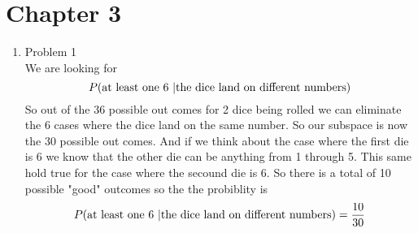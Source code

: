 \documentclass[11pt]{article}
\begin{document}

\section{Chapter 3}
\begin{enumerate}
\item Problem 1\\
We are looking for
$$P(\textnormal{at least one}\ 6\ |\textnormal{the dice land on different numbers})$$
So out of the 36 possible out comes for 2 dice being rolled we can eliminate the 6 cases where the dice land on the same number. So our subspace is now the 30 possible out comes. And if we think about the case where the first die is 6 we know that the other die can be anything from 1 through 5. This same hold true for the case where the secound die is 6. So there is a total of 10 possible "good" outcomes so the the probiblity is 
$$P(\textnormal{at least one}\ 6\ |\textnormal{the dice land on different numbers}) =\frac{10}{30}$$
\begin{center}
\end{center}


\end{enumerate}
\end{document}
